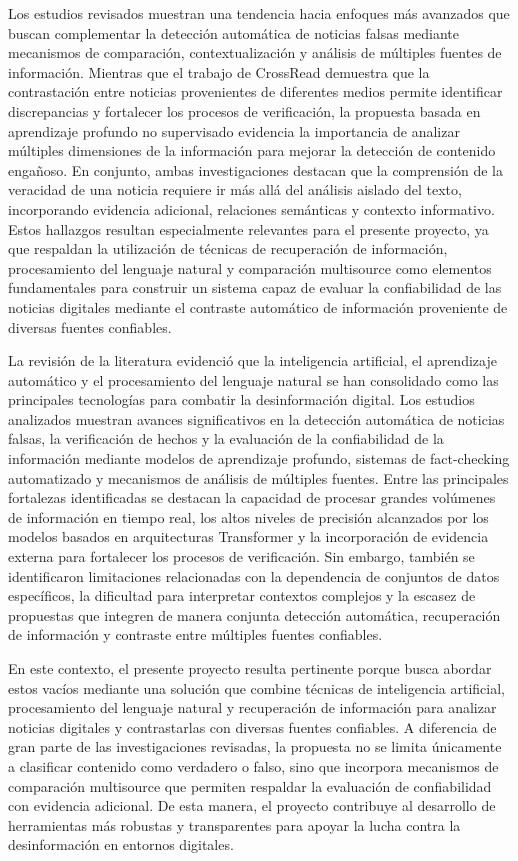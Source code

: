 \documentclass[12pt]{article}
\begin{document}
Los estudios revisados muestran una tendencia hacia enfoques más avanzados que buscan complementar la detección automática de noticias falsas mediante mecanismos de comparación, contextualización y análisis de múltiples fuentes de información. Mientras que el trabajo de CrossRead demuestra que la contrastación entre noticias provenientes de diferentes medios permite identificar discrepancias y fortalecer los procesos de verificación, la propuesta basada en aprendizaje profundo no supervisado evidencia la importancia de analizar múltiples dimensiones de la información para mejorar la detección de contenido engañoso. En conjunto, ambas investigaciones destacan que la comprensión de la veracidad de una noticia requiere ir más allá del análisis aislado del texto, incorporando evidencia adicional, relaciones semánticas y contexto informativo. Estos hallazgos resultan especialmente relevantes para el presente proyecto, ya que respaldan la utilización de técnicas de recuperación de información, procesamiento del lenguaje natural y comparación multisource como elementos fundamentales para construir un sistema capaz de evaluar la confiabilidad de las noticias digitales mediante el contraste automático de información proveniente de diversas fuentes confiables.

La revisión de la literatura evidenció que la inteligencia artificial, el aprendizaje automático y el procesamiento del lenguaje natural se han consolidado como las principales tecnologías para combatir la desinformación digital. Los estudios analizados muestran avances significativos en la detección automática de noticias falsas, la verificación de hechos y la evaluación de la confiabilidad de la información mediante modelos de aprendizaje profundo, sistemas de fact-checking automatizado y mecanismos de análisis de múltiples fuentes. Entre las principales fortalezas identificadas se destacan la capacidad de procesar grandes volúmenes de información en tiempo real, los altos niveles de precisión alcanzados por los modelos basados en arquitecturas Transformer y la incorporación de evidencia externa para fortalecer los procesos de verificación. Sin embargo, también se identificaron limitaciones relacionadas con la dependencia de conjuntos de datos específicos, la dificultad para interpretar contextos complejos y la escasez de propuestas que integren de manera conjunta detección automática, recuperación de información y contraste entre múltiples fuentes confiables.

En este contexto, el presente proyecto resulta pertinente porque busca abordar estos vacíos mediante una solución que combine técnicas de inteligencia artificial, procesamiento del lenguaje natural y recuperación de información para analizar noticias digitales y contrastarlas con diversas fuentes confiables. A diferencia de gran parte de las investigaciones revisadas, la propuesta no se limita únicamente a clasificar contenido como verdadero o falso, sino que incorpora mecanismos de comparación multisource que permiten respaldar la evaluación de confiabilidad con evidencia adicional. De esta manera, el proyecto contribuye al desarrollo de herramientas más robustas y transparentes para apoyar la lucha contra la desinformación en entornos digitales.
\end{document}
